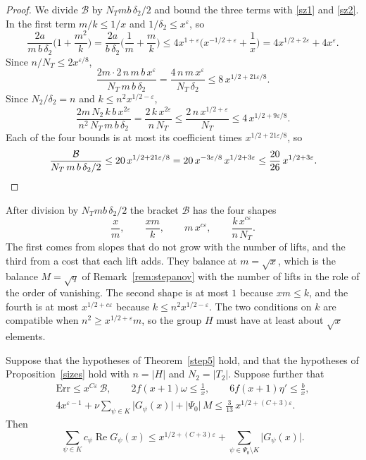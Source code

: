 \begin{proof}
We divide $\mathcal B$ by $N_Tmb\,\delta_2/2$ and bound the three terms with \eqref{sz1} and \eqref{sz2}. In the first term $m/k\le1/x$ and $1/\delta_2\le x^{\varepsilon}$, so
\[
\frac{2a}{m\,b\,\delta_2}\Big(1+\frac{m^2}k\Big)=\frac{2a}{b\,\delta_2}\Big(\frac1m+\frac mk\Big)\le4x^{1+\varepsilon}\Big(x^{-1/2+\varepsilon}+\frac1x\Big)=4x^{1/2+2\varepsilon}+4x^{\varepsilon}.
\]
Since $n/N_T\le2x^{\varepsilon/8}$,
\[
\frac{2m\cdot2\,n\,m\,b\,x^{\varepsilon}}{N_T\,m\,b\,\delta_2}=\frac{4\,n\,m\,x^{\varepsilon}}{N_T\,\delta_2}\le8\,x^{1/2+21\varepsilon/8}.
\]
Since $N_2/\delta_2=n$ and $k\le n^2x^{1/2-\varepsilon}$,
\[
\frac{2m\,N_2\,k\,b\,x^{2\varepsilon}}{n^2\,N_T\,m\,b\,\delta_2}=\frac{2\,k\,x^{2\varepsilon}}{n\,N_T}\le\frac{2\,n\,x^{1/2+\varepsilon}}{N_T}\le4\,x^{1/2+9\varepsilon/8}.
\]
Each of the four bounds is at most its coefficient times $x^{1/2+21\varepsilon/8}$, so
\[
\frac{\mathcal B}{N_T\,m\,b\,\delta_2/2}\le20\,x^{1/2+21\varepsilon/8}=20\,x^{-3\varepsilon/8}\,x^{1/2+3\varepsilon}\le\frac{20}{26}\,x^{1/2+3\varepsilon}.\qedhere
\]
\end{proof}

After division by $N_Tmb\,\delta_2/2$ the bracket $\mathcal B$ has the four shapes
\[
\frac xm,\qquad\frac{xm}k,\qquad m\,x^{c\varepsilon},\qquad\frac{k\,x^{c\varepsilon}}{n\,N_T}.
\]
The first comes from slopes that do not grow with the number of lifts, and the third from a cost that each lift adds. They balance at $m=\sqrt x$, which is the balance $M=\sqrt q$ of Remark~\ref{rem:stepanov} with the number of lifts in the role of the order of vanishing. The second shape is at most $1$ because $xm\le k$, and the fourth is at most $x^{1/2+c\varepsilon}$ because $k\le n^2x^{1/2-\varepsilon}$. The two conditions on $k$ are compatible when $n^2\ge x^{1/2+\varepsilon}m$, so the group $H$ must have at least about $\sqrt x$ elements.

\begin{corollary}\label{asm}
Suppose that the hypotheses of Theorem~\ref{step5} hold, and that the hypotheses of Proposition~\ref{sizes} hold with $n=\lvert H\rvert$ and $N_2=\lvert T_2\rvert$. Suppose further that
\begin{gather*}
\mathrm{Err}\le x^{C\varepsilon}\,\mathcal B,\qquad2f(x+1)\omega\le\frac1x,\qquad6f(x+1)\eta'\le\frac bx,\\
4x^{\varepsilon-1}+\nu\sum_{\psi\in K}\lvert G_\psi(x)\rvert+\lvert\Psi_0\rvert\,M\le\frac3{13}\,x^{1/2+(C+3)\varepsilon}.
\end{gather*}
Then
\[
\sum_{\psi\in K}c_\psi\operatorname{Re}G_\psi(x)\le x^{1/2+(C+3)\varepsilon}+\sum_{\psi\in\Psi_0\setminus K}\lvert G_\psi(x)\rvert .
\]
\end{corollary}


